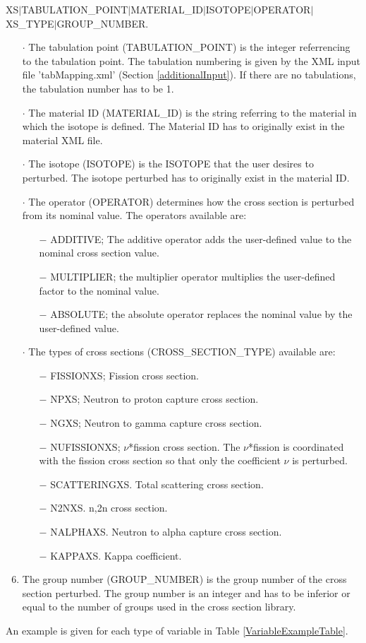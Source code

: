 XS$\vert$TABULATION\_POINT$\vert$MATERIAL\_ID$\vert$ISOTOPE$\vert$OPERATOR$\vert$XS\_TYPE$\vert$GROUP\_NUMBER.
\begin{enumerate}
  \item [$\cdot$]The tabulation point (TABULATION\_POINT) is the integer referrencing to the tabulation point.
  The tabulation numbering is given by the XML input file 'tabMapping.xml' (Section \ref{additionalInput}).
   If there are no tabulations, the tabulation number has to be 1.
  \item [$\cdot$]The material ID (MATERIAL\_ID) is the string referring to the material in which the isotope is defined.
  The Material ID  has to originally exist in the material XML file.
   \item [$\cdot$]The isotope (ISOTOPE) is the ISOTOPE that the user desires to perturbed. The isotope perturbed
   has to originally exist in the material ID.
   \item [$\cdot$]The operator (OPERATOR) determines how the cross section is perturbed from its nominal value.
   The operators available are:
   \begin{enumerate}
      \item[$-$]ADDITIVE; The additive operator adds the user-defined value to the nominal cross section value.
      \item[$-$]MULTIPLIER; the multiplier operator multiplies the user-defined factor to the nominal value.
      \item[$-$]ABSOLUTE; the absolute operator replaces the nominal value by the user-defined value.
  \end{enumerate}
  \item [$\cdot$]The types of cross sections (CROSS\_SECTION\_TYPE) available are:
  \begin{enumerate}
     \item[$-$]FISSIONXS; Fission cross section.
     \item[$-$]NPXS; Neutron to proton capture cross section.
     \item[$-$]NGXS; Neutron to gamma capture cross section.
     \item[$-$]NUFISSIONXS; $\nu$*fission cross section. The $\nu$*fission is coordinated with the
        fission cross section so that only the coefficient $\nu$ is perturbed.
      \item[$-$]SCATTERINGXS. Total scattering cross section.
      \item[$-$]N2NXS. n,2n cross section.
      \item[$-$]NALPHAXS. Neutron to alpha capture cross section.
      \item[$-$]KAPPAXS. Kappa coefficient.
   \end{enumerate}
   \item The group number (GROUP\_NUMBER) is the group number of the cross section perturbed.
    The group number is an integer and has to be inferior or equal to the number of groups used in the cross section library.
\end{enumerate}
An example is given for each type of variable in Table \ref{VariableExampleTable}.

